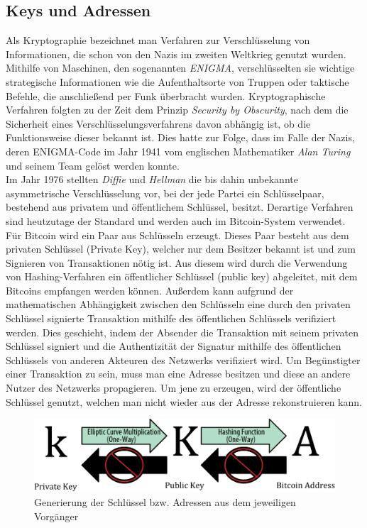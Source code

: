\subsection{Keys und Adressen}
Als Kryptographie bezeichnet man Verfahren zur Verschlüsselung von Informationen, die schon von den Nazis im zweiten Weltkrieg genutzt wurden. 
Mithilfe von Maschinen, den sogenannten \emph{ENIGMA}, verschlüsselten sie wichtige strategische Informationen wie die Aufenthaltsorte von Truppen oder taktische Befehle, die anschließend per Funk überbracht wurden.
Kryptographische Verfahren folgten zu der Zeit dem Prinzip \emph{Security by Obscurity}, nach dem die Sicherheit eines Verschlüsselungsverfahrens davon abhängig ist, ob die Funktionsweise dieser bekannt ist. 
Dies hatte zur Folge, dass im Falle der Nazis, deren ENIGMA-Code im Jahr 1941 vom englischen Mathematiker \emph{Alan Turing} und seinem Team gelöst werden konnte.\\

Im Jahr 1976 stellten \emph{Diffie} und \emph{Hellman} die bis dahin unbekannte asymmetrische Verschlüsselung vor, bei der jede Partei ein Schlüsselpaar, bestehend aus privatem und öffentlichem Schlüssel, besitzt. 
Derartige Verfahren sind heutzutage der Standard und werden auch im Bitcoin-System verwendet.
Für Bitcoin wird ein Paar aus Schlüsseln erzeugt. 
Dieses Paar besteht aus dem privaten Schlüssel (Private Key), welcher nur dem Besitzer bekannt ist und zum Signieren von Transaktionen nötig ist.
Aus diesem wird durch die Verwendung von Hashing-Verfahren ein öffentlicher Schlüssel (public key) abgeleitet, mit dem Bitcoins empfangen werden können.
Außerdem kann aufgrund der mathematischen Abhängigkeit zwischen den Schlüsseln eine durch den privaten Schlüssel signierte Transaktion mithilfe des öffentlichen Schlüssels verifiziert werden. Dies geschieht, indem der Absender die Transaktion mit seinem privaten Schlüssel signiert und die Authentizität der Signatur mithilfe des öffentlichen Schlüssels von anderen Akteuren des Netzwerks verifiziert wird. Um Begünstigter einer Transaktion zu sein, muss man eine Adresse besitzen und diese an andere Nutzer des Netzwerks propagieren. Um jene zu erzeugen, wird der öffentliche Schlüssel genutzt, welchen man nicht wieder aus der Adresse rekonstruieren kann.\\
\begin{figure}[htpb]
	\centering
	\includegraphics[width=\textwidth]{images/public_and_private_key.png}
	\caption{Generierung der Schlüssel bzw. Adressen aus dem jeweiligen Vorgänger}
	\label{6braun:fig:keys}
\end{figure}
